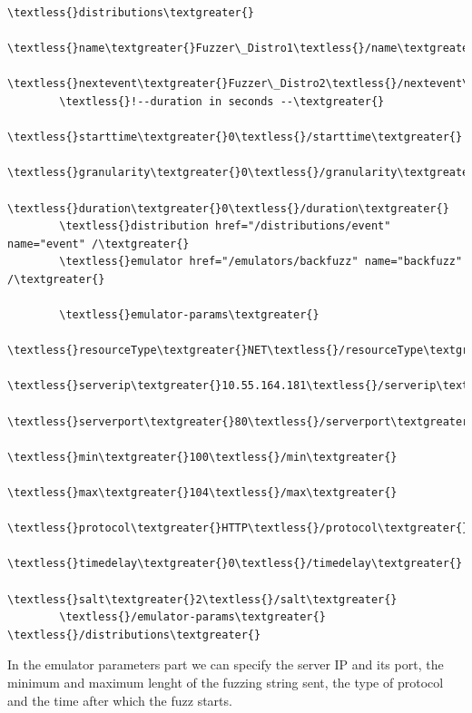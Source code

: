 \documentclass[letterpaper,10pt,english]{sphinxhowto}
\begin{document}
\begin{Verbatim}[commandchars=\\\{\}]
\textless{}distributions\textgreater{}
        \textless{}name\textgreater{}Fuzzer\_Distro1\textless{}/name\textgreater{}
        \textless{}nextevent\textgreater{}Fuzzer\_Distro2\textless{}/nextevent\textgreater{}
        \textless{}!--duration in seconds --\textgreater{}
        \textless{}starttime\textgreater{}0\textless{}/starttime\textgreater{}
        \textless{}granularity\textgreater{}0\textless{}/granularity\textgreater{}
        \textless{}duration\textgreater{}0\textless{}/duration\textgreater{}
        \textless{}distribution href="/distributions/event" name="event" /\textgreater{}
        \textless{}emulator href="/emulators/backfuzz" name="backfuzz" /\textgreater{}

        \textless{}emulator-params\textgreater{}
                \textless{}resourceType\textgreater{}NET\textless{}/resourceType\textgreater{}
                \textless{}serverip\textgreater{}10.55.164.181\textless{}/serverip\textgreater{}
                \textless{}serverport\textgreater{}80\textless{}/serverport\textgreater{}
                \textless{}min\textgreater{}100\textless{}/min\textgreater{}
                \textless{}max\textgreater{}104\textless{}/max\textgreater{}
                \textless{}protocol\textgreater{}HTTP\textless{}/protocol\textgreater{}
                \textless{}timedelay\textgreater{}0\textless{}/timedelay\textgreater{}
                \textless{}salt\textgreater{}2\textless{}/salt\textgreater{}
        \textless{}/emulator-params\textgreater{}
\textless{}/distributions\textgreater{}
\end{Verbatim}

In the emulator parameters part we can specify the server IP and its port, the minimum and maximum lenght of the fuzzing string sent, the type of protocol and the time after which the fuzz starts.
\end{document}
